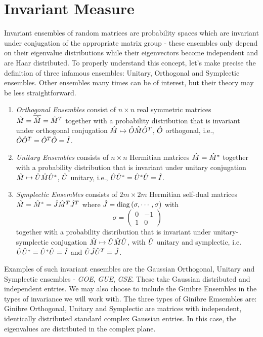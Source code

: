 \section{Invariant Measure}

Invariant ensembles of random matrices are probability spaces which are invariant under conjugation of the appropriate matrix group - these ensembles only depend on their eigenvalue distributions while their eigenvectors become independent and are Haar distributed. To properly understand this concept, let's make precise the definition of three infamous ensembles: Unitary, Orthogonal and Symplectic ensembles. Other ensembles many times can be of interest, but their theory may be less straightforward.

\begin{enumerate}
	\item \textit{Orthogonal Ensembles} consist of $n \times n$ real symmetric matrices $\hat M = \overline{\hat M} = \hat M^T$ together with a probability distribution that is invariant under orthogonal conjugation $\hat M \mapsto \hat O \hat M \hat O^T$, $\hat O$ orthogonal, i.e., $\hat O \hat O^T = \hat O^T \hat O = \hat I$.  
	\item \textit{Unitary Ensembles} consists of $n \times n$ Hermitian matrices $\hat M = \hat M^*$ together with a probability distribution that is invariant under unitary conjugation $\hat M \mapsto \hat U \hat M \hat U^*$, $\hat U$ unitary, i.e., $\hat U \hat U^* = \hat U^* \hat U = \hat I$.  
	\item \textit{Symplectic Ensembles} consists of $2m \times 2m$ Hermitian self-dual matrices $\hat M = \hat M^* = \hat J \hat M^T \hat J^T$ where $\hat J = \operatorname{diag}{(\sigma, \cdots, \sigma)}$ with $$\sigma = \begin{pmatrix} 0 & -1\\	1 & 0 \end{pmatrix}$$  together with a probability distribution that is invariant under unitary-symplectic conjugation $\hat M \mapsto \hat U \hat M \hat U$, with $\hat U$ unitary and symplectic, i.e. $\hat U \hat U^* = \hat U^* \hat U = \hat I$ and $\hat U \hat J \hat U^T = \hat J$.
\end{enumerate}

Examples of such invariant ensembles are the Gaussian Orthogonal, Unitary and Symplectic ensembles - \textit{GOE}, \textit{GUE}, \textit{GSE}. These take Gaussian distributed and independent entries. We may also choose to include the Ginibre Ensembles in the types of invariance we will work with. The three types of Ginibre Emsembles are: Ginibre Orthogonal, Unitary and Symplectic are matrices with independent, identically distributed standard complex Gaussian entries. In this case, the eigenvalues are distributed in the complex plane. 

